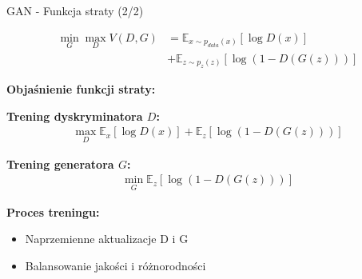 \documentclass{beamer}
\begin{document}
\begin{frame}{GAN - Funkcja straty (2/2)}
  \begin{center}
    \begin{tcolorbox}[
      colback=yellow!10!white, 
      colframe=black!60, 
      boxrule=0.5pt, 
      arc=3mm, 
      boxsep=2pt,
      width=0.8\textwidth %
    ]
      \begin{align*}
        \min_G \max_D V(D,G) &= \mathbb{E}_{x \sim p_{data}(x)}[\log D(x)] \\
        &+ \mathbb{E}_{z \sim p_z(z)}[\log(1 - D(G(z)))]
      \end{align*}
    \end{tcolorbox}
  \end{center}

  \vspace{1em} %

  \textbf{Objaśnienie funkcji straty:}
  \medskip %

  \textbf{Trening dyskryminatora $D$:} 
  \begin{align*}
    \max_D \mathbb{E}_{x}[\log D(x)] + \mathbb{E}_{z}[\log(1 - D(G(z)))]
  \end{align*}
  
  \textbf{Trening generatora $G$:} 
  \begin{align*}
    \min_G \mathbb{E}_{z}[\log(1 - D(G(z)))]
  \end{align*}
  
  \vspace{0.5em} %
  \textbf{Proces treningu:}
  \begin{itemize}
    \item Naprzemienne aktualizacje D i G
    \item Balansowanie jakości i różnorodności
  \end{itemize}
\end{frame}
\end{document}
